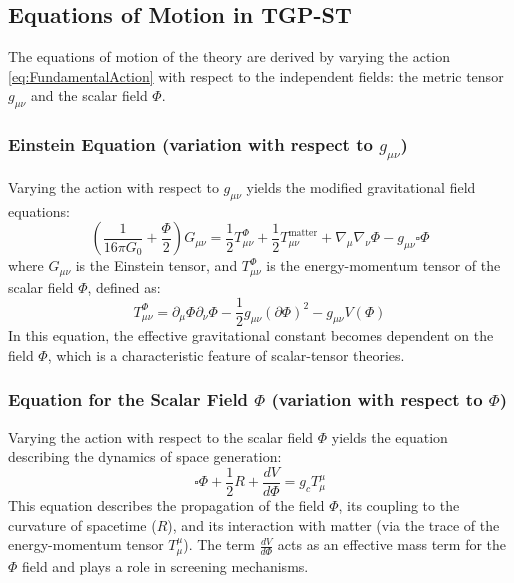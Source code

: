 \documentclass[11pt,a4paper]{article}
\begin{document}
\subsection{Equations of Motion in TGP-ST}
The equations of motion of the theory are derived by varying the action \eqref{eq:FundamentalAction} with respect to the independent fields: the metric tensor $g_{\mu\nu}$ and the scalar field $\Phi$.

\subsubsection{Einstein Equation (variation with respect to $g_{\mu\nu}$)}
Varying the action with respect to $g_{\mu\nu}$ yields the modified gravitational field equations:
\begin{equation}
    \left(\frac{1}{16\pi G_0} + \frac{\Phi}{2}\right) G_{\mu\nu} = \frac{1}{2}T^{\Phi}_{\mu\nu} + \frac{1}{2}T^{\text{matter}}_{\mu\nu} + \nabla_\mu\nabla_\nu\Phi - g_{\mu\nu}\square\Phi
    \label{eq:EinsteinTGP}
\end{equation}
where $G_{\mu\nu}$ is the Einstein tensor, and $T^{\Phi}_{\mu\nu}$ is the energy-momentum tensor of the scalar field $\Phi$, defined as:
\begin{equation}
    T^{\Phi}_{\mu\nu} = \partial_\mu\Phi \partial_\nu\Phi - \frac{1}{2}g_{\mu\nu}(\partial\Phi)^2 - g_{\mu\nu}V(\Phi)
\end{equation}
In this equation, the effective gravitational constant becomes dependent on the field $\Phi$, which is a characteristic feature of scalar-tensor theories.

\subsubsection{Equation for the Scalar Field $\Phi$ (variation with respect to $\Phi$)}
Varying the action with respect to the scalar field $\Phi$ yields the equation describing the dynamics of space generation:
\begin{equation}
    \square\Phi + \frac{1}{2}R + \frac{dV}{d\Phi} = g_{c} T^\mu_\mu
    \label{eq:ScalarFieldEquation}
\end{equation}
This equation describes the propagation of the field $\Phi$, its coupling to the curvature of spacetime ($R$), and its interaction with matter (via the trace of the energy-momentum tensor $T^\mu_\mu$). The term $\frac{dV}{d\Phi}$ acts as an effective mass term for the $\Phi$ field and plays a role in screening mechanisms.
\end{document}
